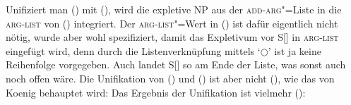 \ea
\label{linking-extraposition}
\z
Unifiziert man () mit (), wird die expletive NP aus der \textsc{add-arg}"=Liste
in die \textsc{arg-list} von () integriert. Der \textsc{arg-list}"=Wert in ()
ist dafür eigentlich nicht nötig, wurde aber wohl spezifiziert, damit das Expletivum
vor S[] in \textsc{arg-list} eingefügt wird, denn durch die Listenverknüpfung
mittels `$\bigcirc$' ist ja keine Reihenfolge vorgegeben. Auch landet S[] so am Ende der
Liste, was sonst auch noch offen wäre.
Die Unifikation von () und () ist aber nicht (), wie das von Koenig
behauptet wird:
\ea
{}
\z
Das Ergebnis der Unifikation ist vielmehr ():
\ea
{}
